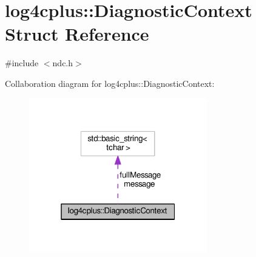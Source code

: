 \hypertarget{structlog4cplus_1_1DiagnosticContext}{\section{log4cplus\-:\-:Diagnostic\-Context Struct Reference}
\label{structlog4cplus_1_1DiagnosticContext}
}


{\ttfamily \#include $<$ndc.\-h$>$}



Collaboration diagram for log4cplus\-:\-:Diagnostic\-Context\-:
\nopagebreak
\begin{figure}[H]
\begin{center}
\leavevmode
\includegraphics[width=220pt]{structlog4cplus_1_1DiagnosticContext__coll__graph}
\end{center}
\end{figure}
